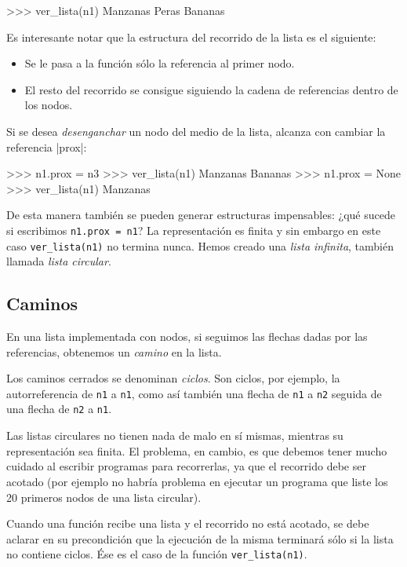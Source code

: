 \begin{codigo-python-sn}
>>> ver_lista(n1)
Manzanas
Peras
Bananas
\end{codigo-python-sn}

Es interesante notar que la estructura del recorrido de la lista es el
siguiente:

\begin{itemize}
\item Se le pasa a la función sólo la referencia al primer nodo.

\item El resto del recorrido se consigue siguiendo la cadena de
referencias dentro de los nodos.
\end{itemize}

Si se desea \emph{desenganchar} un nodo del medio de la lista, alcanza con
cambiar la referencia |prox|:

\begin{codigo-python-sn}
>>> n1.prox = n3
>>> ver_lista(n1)
Manzanas
Bananas
>>> n1.prox = None
>>> ver_lista(n1)
Manzanas
\end{codigo-python-sn}

De esta manera también se pueden generar estructuras impensables:
¿qué sucede si escribimos \lstinline!n1.prox = n1!? La representación es finita
y sin embargo en este caso \lstinline!ver_lista(n1)! no termina nunca. Hemos
creado una \emph{lista infinita}, también llamada \emph{lista circular}.


\subsection{Caminos}

En una lista implementada con nodos, si seguimos las flechas
dadas por las referencias, obtenemos un \emph{camino} en la lista.

Los caminos cerrados se denominan \emph{ciclos}. Son ciclos, por ejemplo, la
autorreferencia de \lstinline|n1| a \lstinline|n1|, como así también una
flecha de \lstinline|n1| a \lstinline|n2| seguida de una flecha de
\lstinline|n2| a \lstinline|n1|.

\begin{atencion}
Las listas circulares no tienen nada de malo en sí mismas,
mientras su representación sea finita. El problema, en cambio, es que debemos tener
mucho cuidado al escribir programas para recorrerlas, ya que el recorrido
debe ser acotado (por ejemplo no habría problema en ejecutar un programa
que liste los 20 primeros nodos de una lista circular).

Cuando una función recibe una lista y el recorrido no está acotado,
se debe aclarar en su precondición que la ejecución de la misma terminará
sólo si la lista no contiene ciclos. Ése es el caso de la función
\lstinline|ver_lista(n1)|.
\end{atencion}

